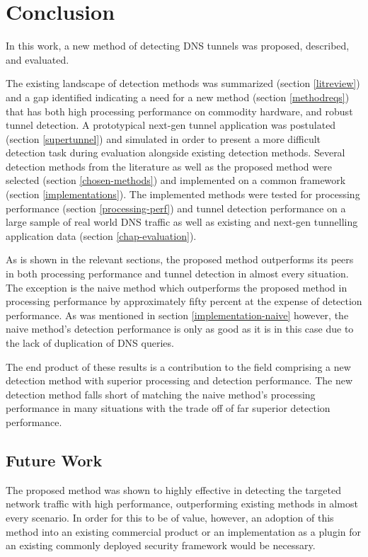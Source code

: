 \documentclass[12pt]{report}
\theoremstyle{remark}
\theoremstyle{definition}
\theoremstyle{definition}
\theoremstyle{definition}
\begin{document}
\chapter{Conclusion}

In this work, a new method of detecting DNS tunnels was proposed, described, and
evaluated.

The existing landscape of detection methods was summarized (section
\ref{litreview}) and a gap identified indicating a need for a new method
(section \ref{methodreqs}) that has both high processing performance on
commodity hardware, and robust tunnel detection. A prototypical next-gen tunnel
application was postulated (section \ref{supertunnel}) and simulated in order to
present a more difficult detection task during evaluation alongside existing
detection methods. Several detection methods from the literature as well as the
proposed method were selected (section \ref{chosen-methods}) and implemented on
a common framework (section \ref{implementations}). The implemented methods were
tested for processing performance (section \ref{processing-perf}) and tunnel
detection performance on a large sample of real world DNS traffic as well as
existing and next-gen tunnelling application data (section
\ref{chap-evaluation}).

As is shown in the relevant sections, the proposed method outperforms its peers
in both processing performance and tunnel detection in almost every situation.
The exception is the naive method which outperforms the proposed method in
processing performance by approximately fifty percent at the expense of
detection performance. As was mentioned in section \ref{implementation-naive}
however, the naive method's detection performance is only as good as it is in
this case due to the lack of duplication of DNS queries.

The end product of these results is a contribution to the field comprising a new
detection method with superior processing and detection performance. The new
detection method falls short of matching the naive method's processing
performance in many situations with the trade off of far superior detection
performance.

\section{Future Work}

The proposed method was shown to highly effective in detecting the targeted network traffic with high performance, outperforming existing methods in almost every scenario. In order for this to be of value, however, an adoption of this method into an existing commercial product or an implementation as a plugin for an existing commonly deployed security framework would be necessary.
\end{document}
